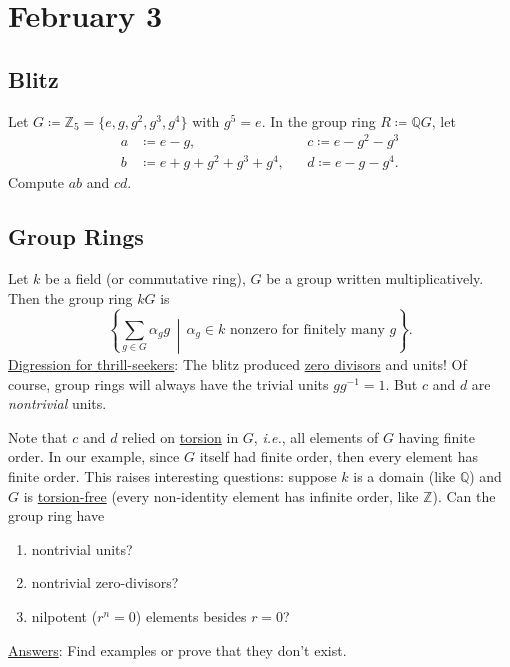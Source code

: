 \documentclass[12pt]{article}
\newcommand{\z}{\mathbb{Z}}
\newcommand{\q}{\mathbb{Q}}
\newcommand{\ita}[1]{\textit{#1}}
\newcommand\inv[1]{#1^{-1}}
\theoremstyle{definition}
\begin{document}
\section{February 3}
\subsection{Blitz}
Let $G\coloneqq \z_5=\{e,g,g^2,g^3,g^4\}$ with $g^5=e$. In the group ring $R\coloneqq \q G$, let 
\begin{align*}
    a&\coloneqq e-g,&&c\coloneqq e-g^2-g^3\\
    b&\coloneqq e+g+g^2+g^3+g^4,&&d\coloneqq e-g-g^4.
\end{align*}
Compute $ab$ and $cd$.
\subsection{Group Rings}
Let $k$ be a field (or commutative ring), $G$ be a group written multiplicatively. Then the group ring $kG$ is 
\begin{equation}
    \left\{\sum\limits_{g\in G}\alpha_gg\,\middle|\,\alpha_g\in k\text{ nonzero for finitely many }g\right\}.
\end{equation}
\underline{Digression for thrill-seekers}: The blitz produced \underline{zero divisors} and units! Of course, group rings will always have the trivial units $g\inv{g}=1$. But $c$ and $d$ are \ita{nontrivial} units.

Note that $c$ and $d$ relied on \underline{torsion} in $G$, \ita{i.e.}, all elements of $G$ having finite order. In our example, since $G$ itself had finite order, then every element has finite order. This raises interesting questions: suppose $k$ is a domain (like $\q$) and $G$ is \underline{torsion-free} (every non-identity element has infinite order, like $\z$). Can the group ring have
\begin{enumerate}
    \item nontrivial units?
    \item nontrivial zero-divisors?
    \item nilpotent ($r^n=0$) elements besides $r=0$?
\end{enumerate}
\underline{Answers}: Find examples or prove that they don't exist.
\end{document}
